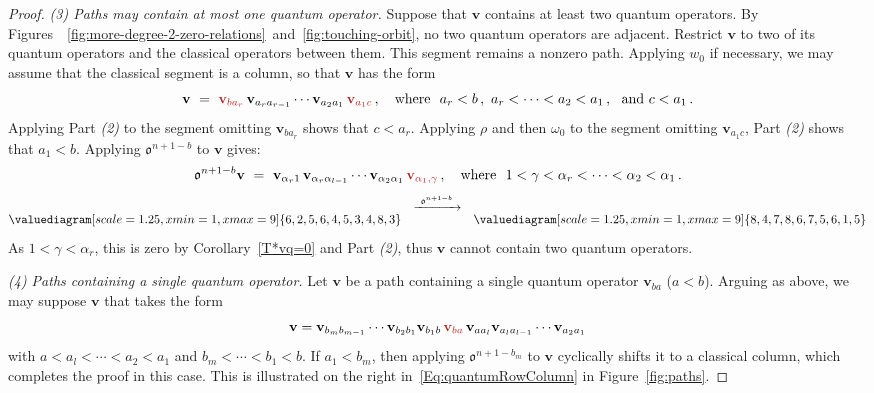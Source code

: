 \documentclass[12pt,oneside,reqno]{amsart}
\theoremstyle{definition}
\numberwithin{equation}{section}
\newcommand{\qv}{{\mathbf v}}
\newcommand{\ncycle}{\mathfrak o}
\begin{document}
\begin{proof}
\noindent\textit{(3) Paths may contain at most one quantum operator.}
Suppose that $\qv$ contains at least two quantum operators.
By Figures~~\ref{fig:more-degree-2-zero-relations}~and~\ref{fig:touching-orbit},
no two quantum operators are adjacent.
Restrict $\qv$ to two of its quantum operators and the classical operators between them.
This segment remains a nonzero path.
Applying $w_0$ if necessary, we may assume that the classical segment is a column,
so that $\qv$ has the form 
%
 \[
    \qv\ =\ {\color{BrickRed}\qv_{b a_r}}\,\qv_{a_r a_{r-1}}\dotsb \qv_{a_2 a_1}\, {\color{BrickRed}\qv_{a_1 c}} \,,\quad\mbox{where }\
    a_r<b\,, \ a_r<\dotsb<a_2<a_1\,,\ \mbox{ and }c<a_1 \,.
 \]
%
Applying Part \textit{(2)} to the segment omitting $\qv_{b a_r}$ shows that $c<a_r$.
Applying $\rho$ and then $\omega_0$ to the segment omitting $\qv_{a_1 c}$, Part \textit{(2)}
shows that $a_1<b$.
Applying $\ncycle^{n+1-b}$ to $\qv$ gives:
\[
    \ncycle^{n+1-b}\qv\ =\ \qv_{\alpha_r 1}\,\qv_{\alpha_r \alpha_{l-1}}\dotsb
   \qv_{\alpha_2 \alpha_1}\, {\color{BrickRed}\qv_{\alpha_1,\gamma}}\,,\quad\mbox{where }\
    1<\gamma<\alpha_r<\dotsb<\alpha_2<\alpha_1 \,.
\]
\[
   \valuediagram[scale=1.25, xmin=1, xmax=9]%
   {{6,2}, {5,6},{4,5},{3,4}, {8,3}}
   \quad \raisebox{10pt}{$\xrightarrow{\ \ncycle^{n+1-b}\ }$} \quad
   \valuediagram[scale=1.25, xmin=1, xmax=9]{{8,4}, {7,8},{6,7},{5,6}, {1,5}}
\]
As $1<\gamma<\alpha_r$, this is zero by Corollary~\ref{T*vq=0} and Part \textit{(2)}, thus  $\qv$ cannot contain two quantum
operators.

\noindent\textit{(4) Paths containing a single quantum operator.}
Let $\qv$ be a path containing a single quantum operator $\qv_{ba}$ ($a<b$).
Arguing as above, we may suppose $\qv$ that takes the form
\begin{equation*}
    \qv =
    \qv_{b_m b_{m-1}} \cdots \qv_{b_2 b_1} \qv_{b_1 b}
    \, {\color{BrickRed}\qv_{ba}}\, 
    \qv_{a a_{l}} \qv_{a_l a_{l-1}} \dotsb\qv_{a_2 a_1}
\end{equation*}
with $a < a_l < \dotsb < a_{2} < a_1$ and $b_{m} < \cdots < b_{1} < b$.
If $a_1<b_m$, then applying $\ncycle^{n{+}1{-}b_m}$ to $\qv$ cyclically shifts it to a classical column, which completes
the proof in this case.
This is illustrated on the right in~\eqref{Eq:quantumRowColumn} in Figure~\ref{fig:paths}.


\end{proof}
\end{document}
